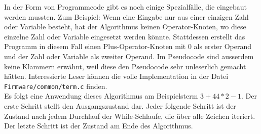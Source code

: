 \documentclass[12pt, a4paper]{report}
\begin{document}
\restoregeometry
In der Form von Programmcode gibt es noch einige Spezialfälle, die eingebaut werden mussten. Zum Beispiel: Wenn eine Eingabe nur aus einer einzigen Zahl oder Variable besteht, hat der Algorithmus keinen Operator-Knoten, wo diese einzelne Zahl oder Variable eingesetzt werden könnte. Stattdessen erstellt das Programm in diesem Fall einen Plus-Operator-Knoten mit 0 als erster Operand und der Zahl oder Variable als zweiter Operand.
Im Pseudocode sind ausserdem keine Klammern erwähnt, weil diese den Pseudocode sehr unleserlich gemacht hätten. Interessierte Leser können die volle Implementation in der Datei \texttt{Firmware/common/term.c} finden.
\\[\medskipamount]
Es folgt eine Anwendung dieses Algorithmus am Beispielsterm $3+44*2-1$. Der erste Schritt stellt den Ausgangszustand dar. Jeder folgende Schritt ist der Zustand nach jedem Durchlauf der While-Schlaufe, die über alle Zeichen iteriert. Der letzte Schritt ist der Zustand am Ende des Algorithmus.
\end{document}
